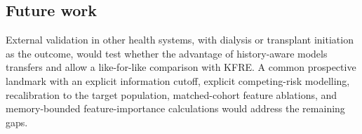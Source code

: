\subsection{Future work}
External validation in other health systems, with dialysis or transplant initiation as the outcome, would test whether the advantage of history-aware models transfers and allow a like-for-like comparison with KFRE. A common prospective landmark with an explicit information cutoff, explicit competing-risk modelling, recalibration to the target population, matched-cohort feature ablations, and memory-bounded feature-importance calculations would address the remaining gaps.
